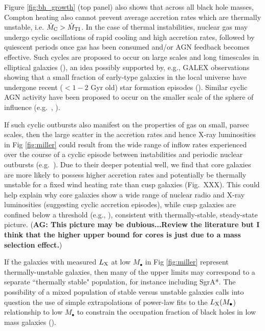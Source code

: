 \documentclass[usenatbib,fleqn]{mn2e}
\begin{document}
Figure \ref{fig:bh_growth} (top panel) also shows that across all
black hole masses, Compton heating also cannot prevent average
accretion rates which are thermally unstable, i.e. $\dot{M}_{\rm C} >
\dot{M}_{\rm TI}$.  In the case of thermal instabilities, nuclear gas
may undergo cyclic oscillations of rapid cooling and high accretion
rates, followed by quiescent periods once gas has been consumed and/or
AGN feedback becomes effective.  Such cycles are proposed to occur on
large scales and long timescales in elliptical galaxies
(\citealt{Ciotti+10}), an idea possibly supported by, e.g., GALEX
observations showing that a small fraction of early-type galaxies in
the local universe have undergone recent ($< 1-2$ Gyr old) star
formation episodes (\citealt{Donas+07}).  Similar cyclic AGN activity
have been proposed to occur on the smaller scale of the sphere of
influence (e.g.~\citealt{Yuan&Li11}, \citealt{Cuarda+15}).

If such cyclic outbursts also manifest on the properties of gas on
small, parsec scales, then the large scatter in the accretion rates
and hence X-ray luminosities in Fig \ref{fig:miller} could result from
the wide range of inflow rates experienced over the course of a cyclic
episode between instabilities and periodic nuclear outbursts
(e.g.~\citealt{Ciotti+10}).  Due to their deeper potential well, we
find that core galaxies are more likely to possess higher accretion
rates and potentially be thermally unstable for a fixed wind heating
rate than cusp galaxies (Fig.~XXX).  This could help explain why core
galaxies show a wide range of nuclear radio and X-ray luminosities
(suggesting cyclic accretion episodes), while cusp galaxies are
confined below a threshold (e.g., \citealt{Bender+89, Pellegrini99,
  Capetti&Balmaverde05}), consistent with thermally-stable,
steady-state picture. ({\bf AG: This picture may be dubious...Review
  the literature but I think that the higher upper bound for cores is
  just due to a mass selection effect.})

If the galaxies with measured $L_{\rm X}$ at low $M_{\bullet}$ in Fig
\ref{fig:miller} represent thermally-unstable galaxies, then many of
the upper limits may correspond to a separate ``thermally stable"
population, for instance including SgrA*.  The possibility of a mixed
population of stable versus unstable galaxies calls into question the
use of simple extrapolations of power-law fits to the $L_{\rm
  X}(M_{\bullet}$) relationship to low $M_{\bullet}$ to constrain the
occupation fraction of black holes in low mass galaxies
(\citealt{Miller+15}).
\end{document}
